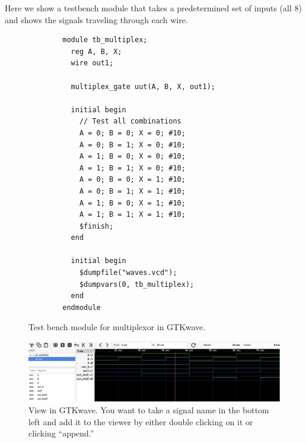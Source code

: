   \begin{example}
    Here we show a testbench module that takes a predetermined set of inputs (all 8) and shows the signals traveling through each wire. 

    \begin{figure}[H]
      \centering 
      \begin{lstlisting}
        module tb_multiplex;
          reg A, B, X;
          wire out1;

          multiplex_gate uut(A, B, X, out1);

          initial begin
            // Test all combinations
            A = 0; B = 0; X = 0; #10;
            A = 0; B = 1; X = 0; #10;
            A = 1; B = 0; X = 0; #10;
            A = 1; B = 1; X = 0; #10;
            A = 0; B = 0; X = 1; #10;
            A = 0; B = 1; X = 1; #10;
            A = 1; B = 0; X = 1; #10;
            A = 1; B = 1; X = 1; #10;
            $finish;
          end

          initial begin
            $dumpfile("waves.vcd");
            $dumpvars(0, tb_multiplex);
          end
        endmodule
      \end{lstlisting}
      \caption{Test bench module for multiplexor in GTKwave.} 
    \end{figure}

    \begin{figure}[H]
      \centering 
      \includegraphics[scale=0.3]{img/multiplexor_gtk.png}
      \caption{View in GTKwave. You want to take a signal name in the bottom left and add it to the viewer by either double clicking on it or clicking ``append.''}
    \end{figure}
  \end{example}

